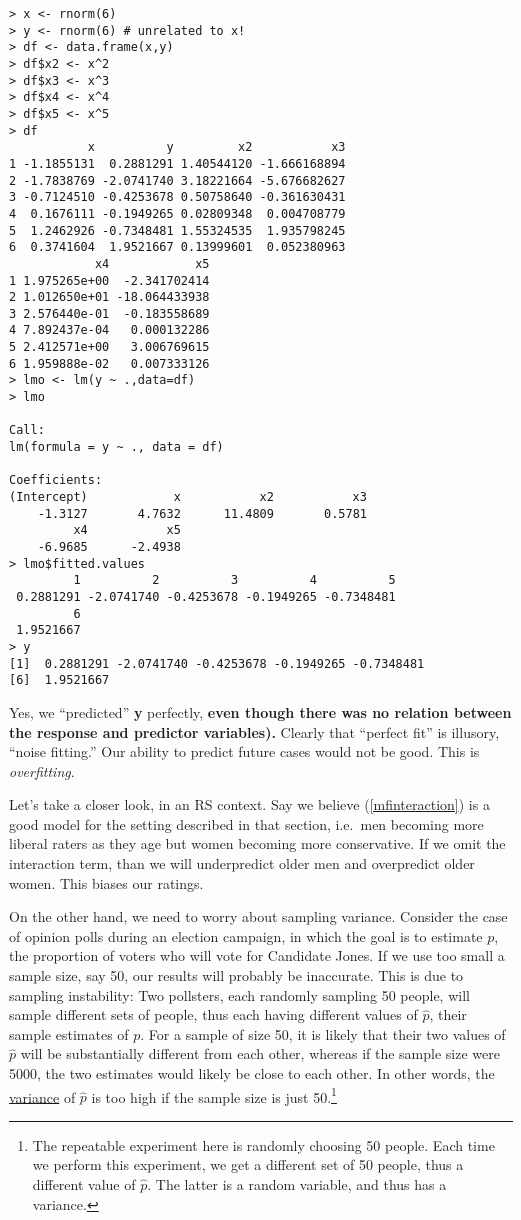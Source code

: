 \begin{lstlisting}
> x <- rnorm(6) 
> y <- rnorm(6) # unrelated to x!
> df <- data.frame(x,y) 
> df$x2 <- x^2 
> df$x3 <- x^3 
> df$x4 <- x^4 
> df$x5 <- x^5 
> df
           x          y         x2           x3
1 -1.1855131  0.2881291 1.40544120 -1.666168894
2 -1.7838769 -2.0741740 3.18221664 -5.676682627
3 -0.7124510 -0.4253678 0.50758640 -0.361630431
4  0.1676111 -0.1949265 0.02809348  0.004708779
5  1.2462926 -0.7348481 1.55324535  1.935798245
6  0.3741604  1.9521667 0.13999601  0.052380963
            x4            x5
1 1.975265e+00  -2.341702414
2 1.012650e+01 -18.064433938
3 2.576440e-01  -0.183558689
4 7.892437e-04   0.000132286
5 2.412571e+00   3.006769615
6 1.959888e-02   0.007333126
> lmo <- lm(y ~ .,data=df) 
> lmo

Call:
lm(formula = y ~ ., data = df)

Coefficients:
(Intercept)            x           x2           x3  
    -1.3127       4.7632      11.4809       0.5781  
         x4           x5  
    -6.9685      -2.4938  
> lmo$fitted.values 
         1          2          3          4          5 
 0.2881291 -2.0741740 -0.4253678 -0.1949265 -0.7348481 
         6 
 1.9521667 
> y
[1]  0.2881291 -2.0741740 -0.4253678 -0.1949265 -0.7348481
[6]  1.9521667
\end{lstlisting}

Yes, we ``predicted'' \textbf{y} perfectly, \textbf{even though there
was no relation between the response and predictor variables).}
Clearly that ``perfect fit'' is illusory, ``noise fitting.''  Our
ability to predict future cases would not be good.  This is
\textit{overfitting}.

Let's take a closer look, in an RS context.  Say we believe
(\ref{mfinteraction}) is a good model for the setting described in that
section, i.e.\ men becoming more liberal raters as they age but women
becoming more conservative.  If we omit the interaction term, than we
will underpredict older men and overpredict older women.  This biases
our ratings.

On the other hand, we need to worry about sampling variance.  Consider
the case of opinion polls during an election campaign, in which the goal
is to estimate $p$, the proportion of voters who will vote for Candidate
Jones.  If we use too small a sample size, say 50, our results will
probably be inaccurate.  This is due to sampling instability:  Two
pollsters, each randomly sampling 50 people, will sample different sets
of people, thus each having different values of $\widehat{p}$, their
sample estimates of $p$.  For a sample of size 50, it is likely that
their two values of $\widehat{p}$ will be substantially different from
each other, whereas if the sample size were 5000, the two estimates
would likely be close to each other.  In other words, the
\underline{variance} of $\widehat{p}$ is too high if the sample size is
just 50.\footnote{The repeatable experiment here is randomly choosing 50
people.  Each time we perform this experiment, we get a different set of
50 people, thus a different value of $\widehat{p}$.  The latter is a
random variable, and thus has a variance.}

